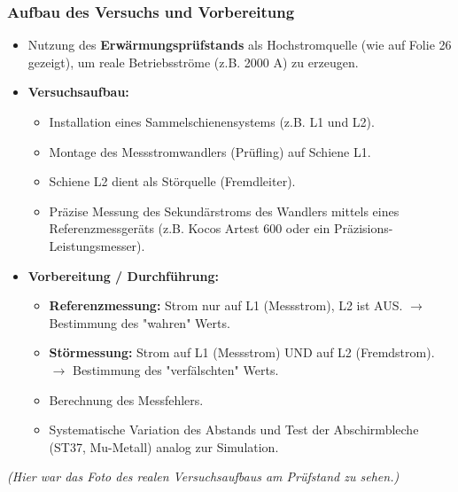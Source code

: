 \begin{frame}
    \frametitle{Aufbau des Versuchs und Vorbereitung}
    \begin{itemize}
        \item Nutzung des \textbf{Erwärmungsprüfstands} als Hochstromquelle (wie auf Folie 26 gezeigt), um reale Betriebsströme (z.B. 2000 A) zu erzeugen.
        \item \textbf{Versuchsaufbau:}
              \begin{itemize}
                  \item Installation eines Sammelschienensystems (z.B. L1 und L2).
                  \item Montage des Messstromwandlers (Prüfling) auf Schiene L1.
                  \item Schiene L2 dient als Störquelle (Fremdleiter).
                  \item Präzise Messung des Sekundärstroms des Wandlers mittels eines Referenzmessgeräts (z.B. Kocos Artest 600 oder ein Präzisions-Leistungsmesser).
              \end{itemize}
        \item \textbf{Vorbereitung / Durchführung:}
              \begin{itemize}
                  \item \textbf{Referenzmessung:} Strom nur auf L1 (Messstrom), L2 ist AUS. $\rightarrow$ Bestimmung des "wahren" Werts.
                  \item \textbf{Störmessung:} Strom auf L1 (Messstrom) UND auf L2 (Fremdstrom). $\rightarrow$ Bestimmung des "verfälschten" Werts.
                  \item Berechnung des Messfehlers.
                  \item Systematische Variation des Abstands und Test der Abschirmbleche (ST37, Mu-Metall) analog zur Simulation.
              \end{itemize}
    \end{itemize}
    \begin{center}
        \textit{(Hier war das Foto des realen Versuchsaufbaus am Prüfstand zu sehen.)}
    \end{center}
\end{frame}

